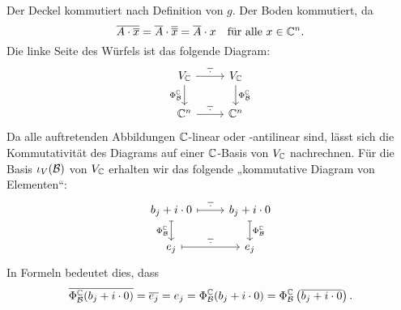 \documentclass[a4paper,10pt]{article}
\begin{document}
Der Deckel kommutiert nach Definition von $g$.
Der Boden kommutiert, da
\[
    \overline{A \cdot \overline{x}}
  = \overline{A} \cdot \overline{\overline{x}}
  = \overline{A} \cdot x
  \quad
  \text{für alle $x \in \mathbb{C}^n$}.
\]
Die linke Seite des Würfels ist das folgende Diagram:
\[
  \begin{tikzcd}
      V_\Cbb
      \arrow[r, "\overline{\,\cdot\,}"]
      \arrow[d, "\Phi^\Cbb_\mc{B}"']
    & V_\Cbb
      \arrow[d, "\Phi^\Cbb_\mc{B}"]
    \\
      \Cbb^n
      \arrow[r, "\overline{\,\cdot\,}"]
    & \Cbb^n
  \end{tikzcd}
\]
Da alle auftretenden Abbildungen $\mathbb{C}$-linear oder -antilinear sind, lässt sich die Kommutativität des Diagrams auf einer $\mathbb{C}$-Basis von $V_{\mathbb{C}}$ nachrechnen.
Für die Basis $\iota_V(\mathcal{B})$ von $V_{\mathbb{C}}$ erhalten wir das folgende „kommutative Diagram von Elementen“:
\[
  \begin{tikzcd}
      b_j + i \cdot 0
      \arrow[r, maps to, "\overline{\,\cdot\,}"]
      \arrow[d, maps to, "\Phi^\Cbb_\mc{B}"']
    & b_j + i \cdot 0
      \arrow[d, maps to, "\Phi^\Cbb_\mc{B}"]
    \\
      e_j
      \arrow[r, maps to, "\overline{\,\cdot\,}"]
    & e_j
  \end{tikzcd}
\]
In Formeln bedeutet dies, dass
\[
    \overline{\Phi^{\mathbb{C}}_{\mathcal{B}}(b_j + i \cdot 0)}
  = \overline{e_j}
  = e_j
  = \Phi^{\mathbb{C}}_{\mathcal{B}}(b_j + i \cdot 0)
  = \Phi^{\mathbb{C}}_{\mathcal{B}}\left( \overline{b_j + i \cdot 0} \right).
\]
\end{document}

